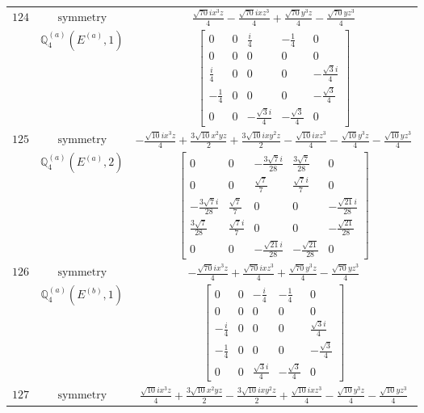\documentclass[fleqn,8pt,landscape]{jsarticle}
\begin{document}
\begin{longtable}{ccc}
$ 124 $ & $ \text{symmetry} $ & $ \frac{\sqrt{70} i x^{3} z}{4} - \frac{\sqrt{70} i x z^{3}}{4} + \frac{\sqrt{70} y^{3} z}{4} - \frac{\sqrt{70} y z^{3}}{4} $ \\
$  $ & $ \mathbb{Q}_{4}^{(a)}(E^{(a)},1) $ & $ \begin{bmatrix} 0 & 0 & \frac{i}{4} & - \frac{1}{4} & 0 \\ 0 & 0 & 0 & 0 & 0 \\ \frac{i}{4} & 0 & 0 & 0 & - \frac{\sqrt{3} i}{4} \\ - \frac{1}{4} & 0 & 0 & 0 & - \frac{\sqrt{3}}{4} \\ 0 & 0 & - \frac{\sqrt{3} i}{4} & - \frac{\sqrt{3}}{4} & 0 \end{bmatrix} $ \\ \hline
$ 125 $ & $ \text{symmetry} $ & $ - \frac{\sqrt{10} i x^{3} z}{4} + \frac{3 \sqrt{10} x^{2} y z}{2} + \frac{3 \sqrt{10} i x y^{2} z}{2} - \frac{\sqrt{10} i x z^{3}}{4} - \frac{\sqrt{10} y^{3} z}{4} - \frac{\sqrt{10} y z^{3}}{4} $ \\
$  $ & $ \mathbb{Q}_{4}^{(a)}(E^{(a)},2) $ & $ \begin{bmatrix} 0 & 0 & - \frac{3 \sqrt{7} i}{28} & \frac{3 \sqrt{7}}{28} & 0 \\ 0 & 0 & \frac{\sqrt{7}}{7} & \frac{\sqrt{7} i}{7} & 0 \\ - \frac{3 \sqrt{7} i}{28} & \frac{\sqrt{7}}{7} & 0 & 0 & - \frac{\sqrt{21} i}{28} \\ \frac{3 \sqrt{7}}{28} & \frac{\sqrt{7} i}{7} & 0 & 0 & - \frac{\sqrt{21}}{28} \\ 0 & 0 & - \frac{\sqrt{21} i}{28} & - \frac{\sqrt{21}}{28} & 0 \end{bmatrix} $ \\ \hline
$ 126 $ & $ \text{symmetry} $ & $ - \frac{\sqrt{70} i x^{3} z}{4} + \frac{\sqrt{70} i x z^{3}}{4} + \frac{\sqrt{70} y^{3} z}{4} - \frac{\sqrt{70} y z^{3}}{4} $ \\
$  $ & $ \mathbb{Q}_{4}^{(a)}(E^{(b)},1) $ & $ \begin{bmatrix} 0 & 0 & - \frac{i}{4} & - \frac{1}{4} & 0 \\ 0 & 0 & 0 & 0 & 0 \\ - \frac{i}{4} & 0 & 0 & 0 & \frac{\sqrt{3} i}{4} \\ - \frac{1}{4} & 0 & 0 & 0 & - \frac{\sqrt{3}}{4} \\ 0 & 0 & \frac{\sqrt{3} i}{4} & - \frac{\sqrt{3}}{4} & 0 \end{bmatrix} $ \\ \hline
$ 127 $ & $ \text{symmetry} $ & $ \frac{\sqrt{10} i x^{3} z}{4} + \frac{3 \sqrt{10} x^{2} y z}{2} - \frac{3 \sqrt{10} i x y^{2} z}{2} + \frac{\sqrt{10} i x z^{3}}{4} - \frac{\sqrt{10} y^{3} z}{4} - \frac{\sqrt{10} y z^{3}}{4} $ \\

\end{longtable}
\end{document}
